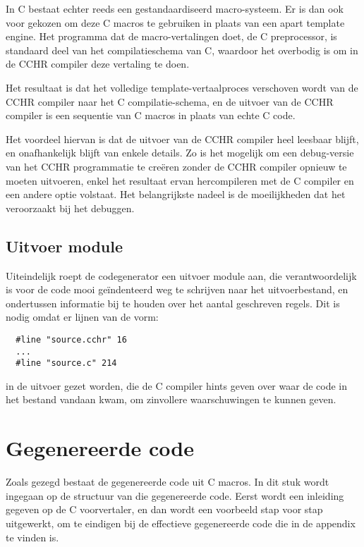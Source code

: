 In C bestaat echter reeds een gestandaardiseerd macro-systeem. Er is dan ook voor gekozen om deze C macros te gebruiken in plaats van een apart template engine. Het programma dat de macro-vertalingen doet, de C preprocessor, is standaard deel van het compilatieschema van C, waardoor het overbodig is om in de CCHR compiler deze vertaling te doen.

Het resultaat is dat het volledige template-vertaalproces verschoven wordt van de CCHR compiler naar het C compilatie-schema, en de uitvoer van de CCHR compiler is een sequentie van C macros in plaats van echte C code.

Het voordeel hiervan is dat de uitvoer van de CCHR compiler heel leesbaar blijft, en onafhankelijk blijft van enkele details. Zo is het mogelijk om een debug-versie van het CCHR programmatie te cre\"eren zonder de CCHR compiler opnieuw te moeten uitvoeren, enkel het resultaat ervan hercompileren met de C compiler en een andere optie volstaat. Het belangrijkste nadeel is de moeilijkheden dat het veroorzaakt bij het debuggen. 

\subsection{Uitvoer module} \label{sec:uitvoer}

Uiteindelijk roept de codegenerator een uitvoer module aan, die verantwoordelijk is voor de code mooi ge\"indenteerd weg te schrijven naar het uitvoerbestand, en ondertussen informatie bij te houden over het aantal geschreven regels. Dit is nodig omdat er lijnen van de vorm: \begin{Verbatim}
  #line "source.cchr" 16
  ...
  #line "source.c" 214
\end{Verbatim}
in de uitvoer gezet worden, die de C compiler hints geven over waar de code in het bestand vandaan kwam, om zinvollere waarschuwingen te kunnen geven. 

\section{Gegenereerde code} \label{sec:gencode}

Zoals gezegd bestaat de gegenereerde code uit C macros. In dit stuk wordt ingegaan op de structuur van die gegenereerde code. Eerst wordt een inleiding gegeven op de C voorvertaler, en dan wordt een voorbeeld stap voor stap uitgewerkt, om te eindigen bij de effectieve gegenereerde code die in de appendix te vinden is.

